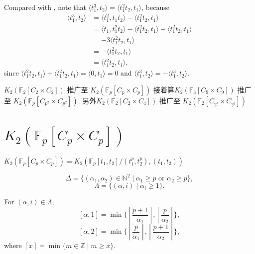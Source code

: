 \begin{remark}
	Compared with \cite{陈虹:419}, note that $\langle t_1^3,t_2 \rangle=\langle t_1^2t_2,t_1\rangle$, because
	\begin{align*}
	\langle t_1^3,t_2 \rangle &= \langle t_1^2,t_1t_2 \rangle-\langle t_1^2t_2,t_1 \rangle \\
		&= \langle t_1,t_1^2t_2 \rangle -\langle t_1^2t_2,t_1 \rangle-\langle t_1^2t_2,t_1 \rangle\\
		&= -3\langle t_1^2t_2,t_1 \rangle\\
		&= -\langle t_1^2t_2,t_1 \rangle \\
		&=\langle t_1^2t_2,t_1 \rangle,
	\end{align*}
	since $\langle t_1^2t_2,t_1 \rangle+\langle t_1^2t_2,t_1 \rangle=\langle 0,t_1\rangle =0$ and $\langle t_1^3,t_2 \rangle=-\langle t_1^3,t_2 \rangle$.
\end{remark}

$K_2(\mathbb{F}_{2}[C_2\times C_2])$ 推广至 $K_2(\mathbb{F}_{p}[C_p\times C_p])$
接着算$K_2(\mathbb{F}_{3}[C_9\times C_9])$ 推广至 $K_2(\mathbb{F}_{p}[C_{p^2}\times C_{p^2}])$. 另外$K_2(\mathbb{F}_{2}[C_2\times C_4])$ 推广至 $K_2(\mathbb{F}_{2}[C_{2^i}\times C_{2^j}])$

\section{$K_2(\mathbb{F}_{p}[C_p\times C_p])$}
$K_2(\mathbb{F}_{p}[C_p\times C_p])=K_2(\mathbb{F}_{p}[t_1,t_2]/(t_1^p,t_2^p),(t_1,t_2))$

\[\Delta =\{(\alpha_1,\alpha_2)\in\mathbb{N}^2\mid  \alpha_1 \geq p \text{ or } \alpha_2 \geq p\},\] 
	\[\Lambda =\{(\alpha,i)\mid \alpha_i \geq 1\}.\]

	For $(\alpha,i)\in \Lambda$, 
	\[ [\alpha,1]=\min\{\left \lceil \frac{p+1}{\alpha_1} \right \rceil, \left \lceil \frac{p}{\alpha_2} \right \rceil \}, \]
	\[ [\alpha,2]=\min\{\left \lceil \frac{p}{\alpha_1} \right \rceil, \left \lceil \frac{p+1}{\alpha_2} \right \rceil \},\]
	where $\left \lceil x \right \rceil=\min \{m\in \mathbb{Z}\mid m\geq x\}$.

